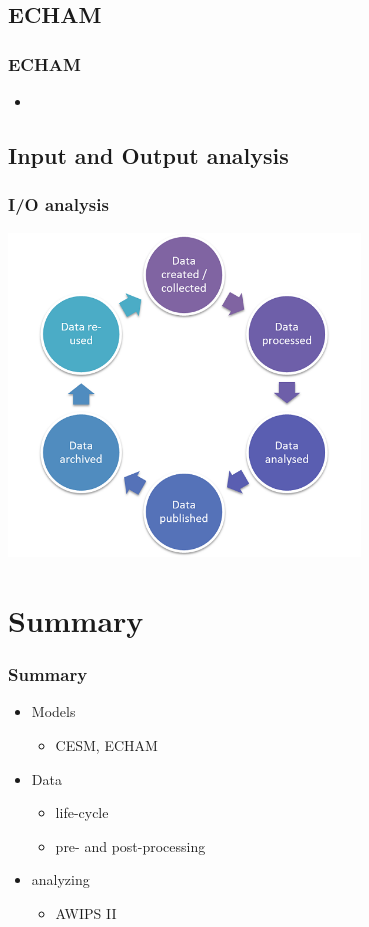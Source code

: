 \documentclass[compress]{beamer}
\begin{document}
\subsection{ECHAM}
\begin{frame}
	\frametitle{ECHAM}
	\begin{itemize}
		\item
	\end{itemize}
\end{frame}


\subsection{Input and Output analysis}
\begin{frame}[fragile]
	\frametitle{I/O analysis}
	\begin{center}
	\includegraphics[width=0.7\textwidth]{gfx/DataLifecycle.png}
	\end{center}

\end{frame}




\section{Summary}

\begin{frame}
	\frametitle{Summary}

	\begin{itemize}
		\item Models
		\begin{itemize}
			\item CESM, ECHAM
		\end{itemize}

		\item Data
		\begin{itemize}
			\item life-cycle
			\item pre- and post-processing
		\end{itemize}
		\item analyzing
		\begin{itemize}
		    \item AWIPS II
		\end{itemize}
	\end{itemize}
\end{frame}
\end{document}

